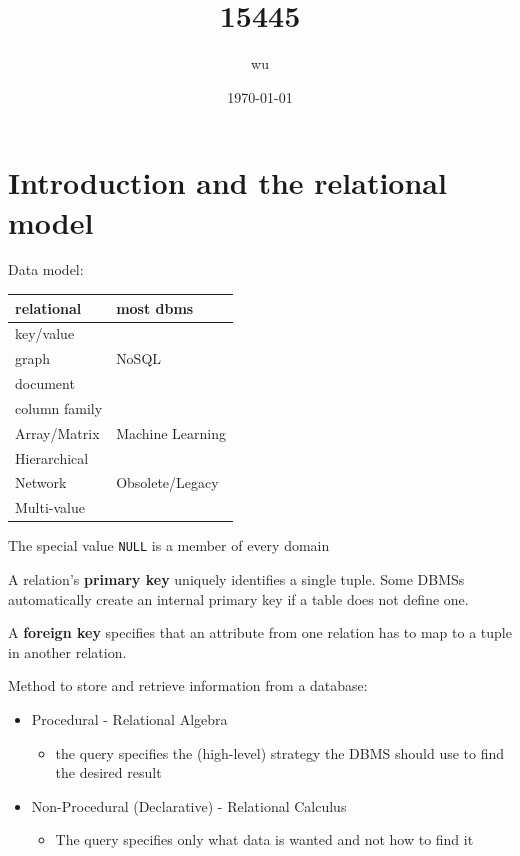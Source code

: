 \documentclass[11pt]{article}
\author{wu}
\date{\today}
\title{15445}
\begin{document}
\maketitle
\tableofcontents

\section{Introduction and the relational model}
\label{sec:org3a3fdc6}
Data model:

\begin{center}
\begin{tabular}{ll}
relational & most dbms\\
\hline
key/value & \\
graph & NoSQL\\
document & \\
column family & \\
\hline
Array/Matrix & Machine Learning\\
\hline
Hierarchical & \\
Network & Obsolete/Legacy\\
Multi-value & \\
\end{tabular}
\end{center}


The special value \texttt{NULL} is a member of every domain

A relation's \textbf{primary key} uniquely identifies a single tuple. Some DBMSs automatically create an
internal primary key if a table does not define one.

A \textbf{foreign key} specifies that an attribute from one relation has to map to a tuple in another
relation.

Method to store and retrieve information from a database:
\begin{itemize}
\item Procedural - Relational Algebra
\begin{itemize}
\item the query specifies the (high-level) strategy the DBMS should use to find the desired result
\end{itemize}
\item Non-Procedural (Declarative) - Relational Calculus
\begin{itemize}
\item The query specifies only what data is wanted and not how to find it
\end{itemize}
\end{itemize}
\end{document}
